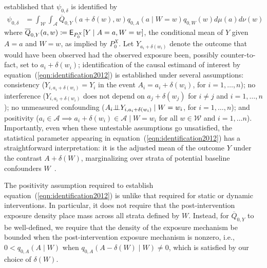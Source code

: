 \citet{diaz2012population} established that $\psi_{0,\delta}$ is
identified by
\begin{align}\label{eqn:identification2012}
  \psi_{0,\delta} &= \int_{\mathcal{W}} \int_{\mathcal{A}}
  \overline{Q}_{0,Y}(a + \delta(w), w) q_{0, A}(a \mid W = w)
  q_{0, W}(w) d\mu(a)d\nu(w)
\end{align}
where $\overline{Q}_{0,Y}(a,w) \coloneqq \mathsf{E}_{P_0^X}[Y \mid A = a, W = w]$, the
conditional mean of $Y$ given $A = a$ and $W = w$, as implied by $P_0^X$. Let
$Y_{a_i + \delta(w_i)}$ denote the outcome that would have been observed had the
observed exposure been, possibly counter-to-fact, set to $a_i + \delta(w_i)$;
identification of the causal estimand of interest by
equation~(\ref{eqn:identification2012}) is established under several
assumptions: consistency ($Y_{i, a_i + \delta(w_i)} = Y_i$ in the event $A_i
= a_i + \delta(w_i)$, for $i = 1, \ldots, n$); no interference ($Y_{i, a_i
+ \delta(w_i)}$ does not depend on $a_j + \delta(w_j)$ for $i \neq j$ and $i
= 1, \ldots, n$); no unmeasured confounding ($A_i \mbox{$\perp\!\!\!\perp$} Y_{i, a_i
+ \delta(w_i)} \mid W = w_i$, for $i = 1, \ldots, n$); and positivity ($a_i \in
\mathcal{A} \implies a_i + \delta(w_i) \in \mathcal{A} \mid W = w_i$ for all $w
\in \mathcal{W}$ and $i = 1, \ldots n$). Importantly, even when these untestable
assumptions go unsatisfied, the statistical parameter appearing in
equation~(\ref{eqn:identification2012}) has a straightforward interpretation: it
is the adjusted mean of the outcome $Y$ under the contrast $A + \delta(W)$,
marginalizing over strata of potential baseline confounders
$W$~\citep{diaz2012population, vdl2011targeted}.

The positivity assumption required to establish
equation~(\ref{eqn:identification2012}) is unlike that required for static or
dynamic interventions. In particular, it does not require that the
post-intervention exposure density place mass across all strata defined by $W$.
Instead, for $\overline{Q}_{0,Y}$ to be well-defined, we require that the
density of the exposure mechanism be bounded when the post-intervention exposure
mechanism is nonzero, i.e., $0 < q_{0,A}(A \mid W)$ when $q_{0,A}(A - \delta(W)
\mid W) \neq 0$, which is satisfied by our choice of $\delta(W)$.

